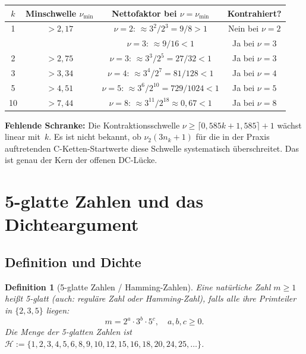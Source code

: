 \documentclass[12pt,a4paper]{article}
\newtheorem{definition}{Definition}[section]
\newcommand{\vii}{\nu_2}
\begin{document}
\begin{center}
\renewcommand{\arraystretch}{1.4}
\begin{tabular}{cccc}
\toprule
$k$ & Minschwelle $\nu_{\min}$ & Nettofaktor bei $\nu = \nu_{\min}$ & Kontrahiert? \\
\midrule
1 & $> 2{,}17$ & $\nu=2$: $\approx 3^2/2^3 = 9/8 > 1$ & Nein bei $\nu=2$ \\
  &            & $\nu=3$: $\approx 9/16 < 1$ & Ja bei $\nu=3$ \\
2 & $> 2{,}75$ & $\nu=3$: $\approx 3^3/2^5 = 27/32 < 1$ & Ja bei $\nu=3$ \\
3 & $> 3{,}34$ & $\nu=4$: $\approx 3^4/2^7 = 81/128 < 1$ & Ja bei $\nu=4$ \\
5 & $> 4{,}51$ & $\nu=5$: $\approx 3^6/2^{10} = 729/1024 < 1$ & Ja bei $\nu=5$ \\
10 & $> 7{,}44$ & $\nu=8$: $\approx 3^{11}/2^{18} \approx 0{,}67 < 1$ & Ja bei $\nu=8$ \\
\bottomrule
\end{tabular}
\end{center}

\begin{tcolorbox}[warnung]
\textbf{Fehlende Schranke:} Die Kontraktionsschwelle $\nu \geq \lceil 0{,}585k + 1{,}585 \rceil + 1$
wächst linear mit~$k$. Es ist nicht bekannt, ob $\vii(3n_k+1)$ für
die in der Praxis auftretenden C-Ketten-Startwerte diese Schwelle
systematisch überschreitet. Das ist genau der Kern der offenen DC-Lücke.
\end{tcolorbox}

\section{5-glatte Zahlen und das Dichteargument}
\label{sec:fglatt}

\subsection{Definition und Dichte}

\begin{definition}[5-glatte Zahlen / Hamming-Zahlen]
Eine natürliche Zahl $m \geq 1$ heißt \emph{5-glatt} (auch: \emph{reguläre Zahl}
oder \emph{Hamming-Zahl}), falls alle ihre Primteiler in $\{2, 3, 5\}$ liegen:
\[
  m = 2^a \cdot 3^b \cdot 5^c, \quad a, b, c \geq 0.
\]
Die Menge der 5-glatten Zahlen ist $\mathcal{H} := \{1, 2, 3, 4, 5, 6, 8, 9,
10, 12, 15, 16, 18, 20, 24, 25, \ldots\}$.
\end{definition}
\end{document}
